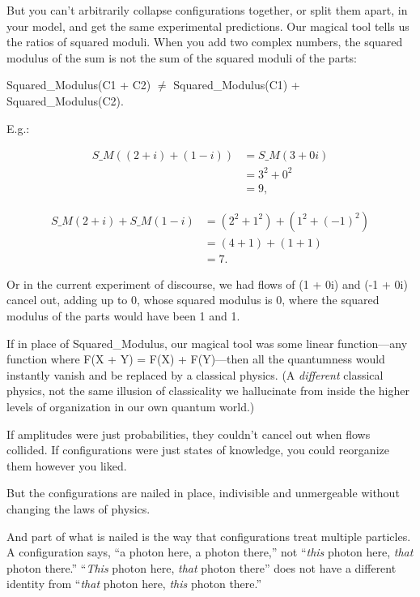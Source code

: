 {
 But you can't arbitrarily collapse configurations
together, or split them apart, in your model, and get the same
experimental predictions. Our magical tool tells us the ratios of
squared moduli. When you add two complex numbers, the squared modulus
of the sum is not the sum of the squared moduli of the parts:}

{\centering
 Squared\_Modulus(C1 + C2) ${\neq}$ Squared\_Modulus(C1) +
Squared\_Modulus(C2).
\par}


\bigskip

{
 E.g.:}

\begin{align*}
 S\_M((2 + i) + (1 - i)) &= S\_M(3 + 0i)\\
 &= 3^2 + 0^2\\
 &= 9,
\end{align*}


\begin{align*}
 S\_M(2 + i) + S\_M(1 - i) &= (2^2 + 1^2)+ ( 1^2 + (-1)^2)\\
 &= (4 + 1) + (1 + 1)\\
 &= 7.
\end{align*}


\bigskip

{
 Or in the current experiment of discourse, we had flows of (1 +
0i) and (-1 + 0i) cancel out, adding up to 0, whose squared modulus is
0, where the squared modulus of the parts would have been 1 and 1.}

{
 If in place of Squared\_Modulus, our magical tool was some linear
function---any function where F(X + Y) = F(X) + F(Y)---then all the
quantumness would instantly vanish and be replaced by a classical
physics. (A \textit{different} classical physics, not the same illusion
of classicality we hallucinate from inside the higher levels of
organization in our own quantum world.)}

{
 If amplitudes were just probabilities, they
couldn't cancel out when flows collided. If
configurations were just states of knowledge, you could reorganize them
however you liked.}

{
 But the configurations are nailed in place, indivisible and
unmergeable without changing the laws of physics.}

{
 And part of what is nailed is the way that configurations treat
multiple particles. A configuration says, ``a photon
here, a photon there,'' not
``\textit{this} photon here, \textit{that} photon
there.'' ``\textit{This} photon
here, \textit{that} photon there'' does not have a
different identity from ``\textit{that} photon here,
\textit{this} photon there.''}

